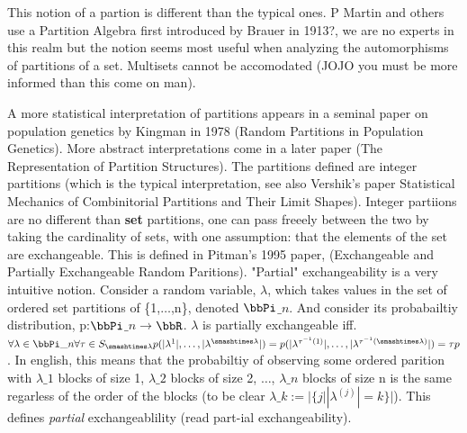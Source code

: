 \documentclass[12pt,a4paper]{article}
\begin{document}
This notion of a partion is different than the typical ones. P Martin and others use a Partition Algebra first introduced by Brauer in 1913?, we are no experts in this realm but the notion seems most useful when analyzing the automorphisms of partitions of a set. Multisets cannot be accomodated (JOJO you must be more informed than this come on man).


A more statistical interpretation of partitions appears in a seminal paper on population genetics by Kingman in 1978 (Random Partitions in Population Genetics). More abstract interpretations come in a later paper (The Representation of Partition Structures). The partitions defined are integer partitions (which is the typical interpretation, see also Vershik's paper Statistical Mechanics of Combinitorial Partitions and Their Limit Shapes). Integer partiions are no different than \textbf{set} partitions, one can pass freeely between the two by taking the cardinality of sets, with one assumption: that the elements of the set are exchangeable. This is defined in Pitman's 1995 paper, (Exchangeable and Partially Exchangeable Random Paritions). "Partial" exchangeability is a very intuitive notion. Consider a random variable, \ensuremath{\lambda}, which takes values in the set of ordered set partitions of \{1,\ensuremath{\ldots},n\}, denoted \ensuremath{\bbPi}\ensuremath{\_n}. And consider its probabailtiy distribution, p:\ensuremath{\bbPi}\ensuremath{\_n}\ensuremath{\rightarrow}\ensuremath{\bbR}. \ensuremath{\lambda} is partially exchangeable iff. $\ensuremath{\forall} \ensuremath{\lambda} \ensuremath{\in} \ensuremath{\bbPi}\ensuremath{\_n} \ensuremath{\forall} \ensuremath{\tau} \ensuremath{\in} S_{\ensuremath{\smashtimes}\ensuremath{\lambda}} p(|\ensuremath{\lambda}^{1}|, \ensuremath{\ldots}, |\ensuremath{\lambda}^{\ensuremath{\smashtimes}\ensuremath{\lambda}}|) = p(|\ensuremath{\lambda}^{\ensuremath{\tau}^{-1}(1)}|, \ensuremath{\ldots}, |\ensuremath{\lambda}^{\ensuremath{\tau}^{-1}(\ensuremath{\smashtimes}\ensuremath{\lambda})}|) = \ensuremath{\tau}p$. In english, this means that the probabiltiy of observing some ordered parition with \ensuremath{\lambda}\ensuremath{\_1} blocks of size 1, \ensuremath{\lambda}\ensuremath{\_2} blocks of size 2, \ensuremath{\ldots}, \ensuremath{\lambda}\ensuremath{\_n} blocks of size n is the same regarless of the order of the blocks (to be clear $\ensuremath{\lambda}\ensuremath{\_k} := |\{j| |\ensuremath{\lambda}^{(j)}| = k \}|$). This defines \emph{partial} exchangeablility (read part-ial exchangeability).
\end{document}
